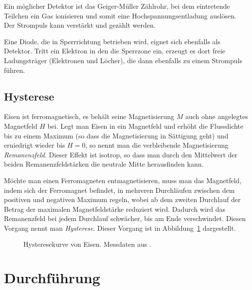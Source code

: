 \documentclass[11pt, ngerman, fleqn, DIV=15, headinclude, BCOR=2cm]{scrreprt}
\begin{document}
Ein möglicher Detektor ist das Geiger-Müller Zählrohr, bei dem eintretende
Teilchen ein Gas ionisieren und somit eine Hochspannungsentladung auslösen. Der
Strompuls kann verstärkt und gezählt werden.

Eine Diode, die in Sperrrichtung betrieben wird, eignet sich ebenfalls als
Detektor. Tritt ein Elektron in den die Sperrzone ein, erzeugt es dort freie
Ladungsträger (Elektronen und Löcher), die dann ebenfalls zu einem Strompuls
führen.

\section{Hysterese}

Eisen ist ferromagnetisch, es behält seine Magnetisierung $M$ auch ohne
angelegtes Magnetfeld $H$ bei. Legt man Eisen in ein Magnetfeld und erhöht die
Flussdichte bis zu einem Maximum (so dass die Magnetisierung in Sättigung geht)
und erniedrigt wieder bis $H = 0$, so nennt man die verbleibende Magnetisierung
\emph{Remanenzfeld}. Dieser Effekt ist isotrop, so dass man durch den
Mittelwert der beiden Remanenzfeldstärken die neutrale Mitte herausfinden kann.

Möchte man einen Ferromagneten entmagnetisieren, muss man das Magnetfeld, indem
sich der Ferromagnet befindet, in mehreren Durchläufen zwischen dem positiven
und negativen Maximum regeln, wobei ab dem zweiten Durchlauf der
Betrag der maximalen Magnetfeldstärke reduziert wird. Dadurch wird das
Remanenzfeld bei jedem Durchlauf schwächer, bis am Ende verschwindet. Diesen
Vorgang nennt man \emph{Hysterese}. Dieser Vorgang ist in
Abbildung~\ref{fig:hysterese} dargestellt.

\begin{figure}[htbp]
    \centering
    \caption{%
        Hysteresekurve von Eisen. Messdaten aus \parencite{Ueding/248}.
    }
    \label{fig:hysterese}
\end{figure}

\chapter{Durchführung}
\end{document}

